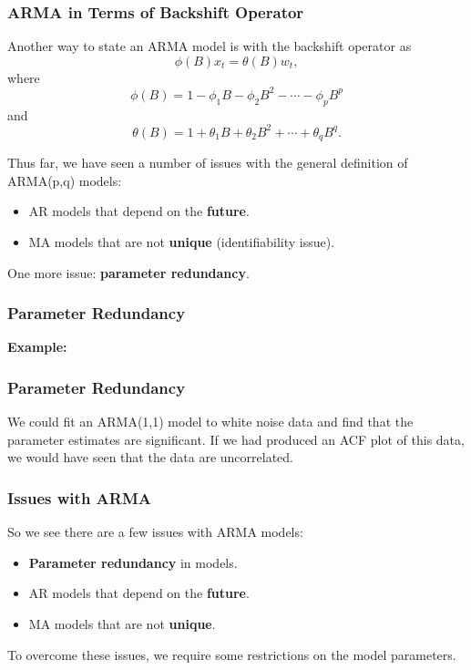 \documentclass[%
xcolor=pdftex]{beamer}
\begin{document}
\begin{frame}
\frametitle{ARMA in Terms of Backshift Operator}

Another way to state an ARMA model is with the backshift operator as
\begin{equation} \label{eq:arma_op}
\phi(B)x_t=\theta(B) w_t,
\end{equation}
where
$$
\phi(B) = 1-\phi_1 B - \phi_2 B^2 - \cdots - \phi_p B^p
$$
and
$$
\theta(B) = 1+\theta_1 B + \theta_2 B^2 + \cdots + \theta_q B^q.
$$

Thus far, we have seen a number of issues with the general definition of ARMA(p,q) models:

\begin{itemize}
\item AR models that depend on the \textbf{future}.
\item MA models that are not \textbf{unique} (identifiability issue).
\end{itemize}

One more issue: \textbf{parameter redundancy}.

\end{frame}

\begin{frame}
\frametitle{Parameter Redundancy}

\textbf{Example:}

\vspace{80mm}


\end{frame}


\begin{frame}
\frametitle{Parameter Redundancy}

We could fit an ARMA(1,1) model to white noise data and find that the parameter estimates are significant. If we had produced an ACF plot of this data, we would have seen that the data are uncorrelated.

\end{frame}

\begin{frame}
\frametitle{Issues with ARMA}

So we see there are a few issues with ARMA models:

\begin{itemize}
\item \textbf{Parameter redundancy} in models.
\item AR models that depend on the \textbf{future}.
\item MA models that are not \textbf{unique}.
\end{itemize}

To overcome these issues, we require some restrictions on the model parameters.

\end{frame}
\end{document}
